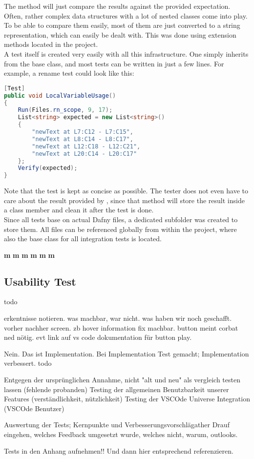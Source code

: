 The  method will just compare the results against the provided expectation. Often, rather complex data structures with a lot of nested classes come into play. To be able to compare them easily, most of them are just converted to a string representation, which can easily be dealt with. This was done using extension methods located in the  project.\\

A test itself is created very easily with all this infrastructure. One simply inherits from the base class, and most tests can be written in just a few lines. For example, a rename test could look like this:

\begin{lstlisting}[language=csharp, caption={Sample Integration Test}, captionpos=b, label={lst:sampleintegrationtest}]
[Test]
public void LocalVariableUsage()
{
    Run(Files.rn_scope, 9, 17);
    List<string> expected = new List<string>()
    {
        "newText at L7:C12 - L7:C15",
        "newText at L8:C14 - L8:C17",
        "newText at L12:C18 - L12:C21",
        "newText at L20:C14 - L20:C17"
    };
    Verify(expected);
}
\end{lstlisting}

Note that the test is kept as concise as possible. The tester does not even have to care about the result provided by , since that method will store the result inside a class member and clean it after the test is done.\\

Since all tests base on actual Dafny files, a dedicated subfolder was created to store them. All files can be referenced globally from within the  project, where also the base class for all integration tests is located.




\textbf{m}
\textbf{m}
\textbf{m}
\textbf{m}
\textbf{m}
\textbf{m}


\subsection{Usability Test}

todo

erkentnisse notieren. was machbar, war nicht. was haben wir noch geschafft. vorher nachher screen.
zb hover information fix machbar. button meint corbat ned nötig. evt link auf vs code dokumentation für button play.


Nein. Das ist Implementation. Bei Implementation Test gemacht; Implementation verbessert.
todo

Entgegen der ursprünglichen Annahme, nicht "alt und neu" als vergleich testen lassen (fehlende probanden)
Testing der allgemeinen Benutzbarkeit unserer Features (verständlichkeit, nützlichkeit)
Testing der VSCOde Universe Integration (VSCOde Benutzer)

Auswertung der Tests; Kernpunkte und Verbesserungsvorschlägather
Drauf eingehen, welches Feedback umgesetzt wurde, welches nicht, warum, outlooks.

Tests in den Anhang aufnehmen!! Und dann hier entsprechend referenzieren.
